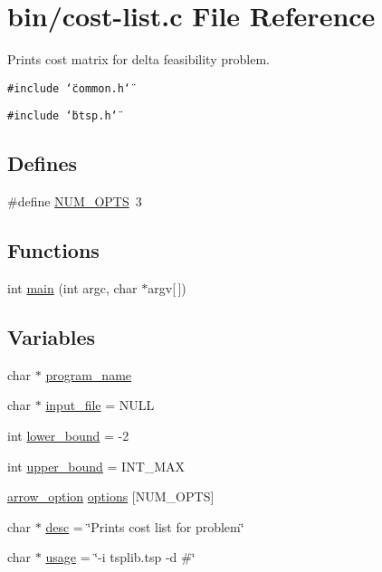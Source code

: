 \hypertarget{cost-list_8c}{
\section{bin/cost-list.c File Reference}
\label{cost-list_8c}
}
Prints cost matrix for delta feasibility problem.  


{\tt \#include \char`\"{}common.h\char`\"{}}\par
{\tt \#include \char`\"{}btsp.h\char`\"{}}\par
\subsection*{Defines}
\begin{CompactItemize}
\item 
\#define \hyperlink{cost-list_8c_9b58b2c4af931c8486a986c9deca40f5}{NUM\_\-OPTS}~3
\end{CompactItemize}
\subsection*{Functions}
\begin{CompactItemize}
\item 
int \hyperlink{cost-list_8c_0ddf1224851353fc92bfbff6f499fa97}{main} (int argc, char $\ast$argv\mbox{[}$\,$\mbox{]})
\end{CompactItemize}
\subsection*{Variables}
\begin{CompactItemize}
\item 
char $\ast$ \hyperlink{cost-list_8c_289c5900d90626d909f0a85d5a0ed61d}{program\_\-name}
\item 
char $\ast$ \hyperlink{cost-list_8c_a4f3a15de34c409bdec6ceacf93078ed}{input\_\-file} = NULL
\item 
int \hyperlink{cost-list_8c_ed7394fd8e0c2796b26b9654fd10fd9d}{lower\_\-bound} = -2
\item 
int \hyperlink{cost-list_8c_f5a34eb1d01ffd792adcadc9627ffcb8}{upper\_\-bound} = INT\_\-MAX
\item 
\hyperlink{structarrow__option}{arrow\_\-option} \hyperlink{cost-list_8c_cea6a9709d519c143f30db401a0d0c72}{options} \mbox{[}NUM\_\-OPTS\mbox{]}
\item 
char $\ast$ \hyperlink{cost-list_8c_3aad16fd4bea1b9717f232ea75ad6449}{desc} = \char`\"{}Prints cost list for problem\char`\"{}
\item 
char $\ast$ \hyperlink{cost-list_8c_adebe2487a2c5240ab6cd02c83add0bf}{usage} = \char`\"{}-i tsplib.tsp -d \#\char`\"{}
\end{CompactItemize}


